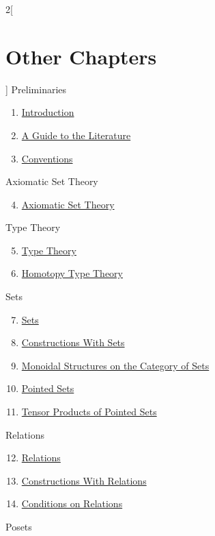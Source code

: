 \begin{multicols}{2}[\section{Other Chapters}]
\noindent
Preliminaries
\begin{enumerate}
\item \hyperref[introduction:section-phantom]{Introduction}
\item \hyperref[a-guide-to-the-literature:section-phantom]{A Guide to the Literature}
\item \hyperref[conventions:section-phantom]{Conventions}
\end{enumerate}
Axiomatic Set Theory
\begin{enumerate}
\setcounter{enumi}{3}
\item \hyperref[axiomatic-set-theory:section-phantom]{Axiomatic Set Theory}
\end{enumerate}
Type Theory
\begin{enumerate}
\setcounter{enumi}{4}
\item \hyperref[type-theory:section-phantom]{Type Theory}
\item \hyperref[homotopy-type-theory:section-phantom]{Homotopy Type Theory}
\end{enumerate}
Sets
\begin{enumerate}
\setcounter{enumi}{6}
\item \hyperref[sets:section-phantom]{Sets}
\item \hyperref[constructions-with-sets:section-phantom]{Constructions With Sets}
\item \hyperref[monoidal-structures-on-the-category-of-sets:section-phantom]{Monoidal Structures on the Category of Sets}
\item \hyperref[pointed-sets:section-phantom]{Pointed Sets}
\item \hyperref[tensor-products-of-pointed-sets:section-phantom]{Tensor Products of Pointed Sets}
\end{enumerate}
Relations
\begin{enumerate}
\setcounter{enumi}{11}
\item \hyperref[relations:section-phantom]{Relations}
\item \hyperref[constructions-with-relations:section-phantom]{Constructions With Relations}
\item \hyperref[conditions-on-relations:section-phantom]{Conditions on Relations}
\end{enumerate}
Posets
\begin{enumerate}

\end{enumerate}
\end{multicols}
